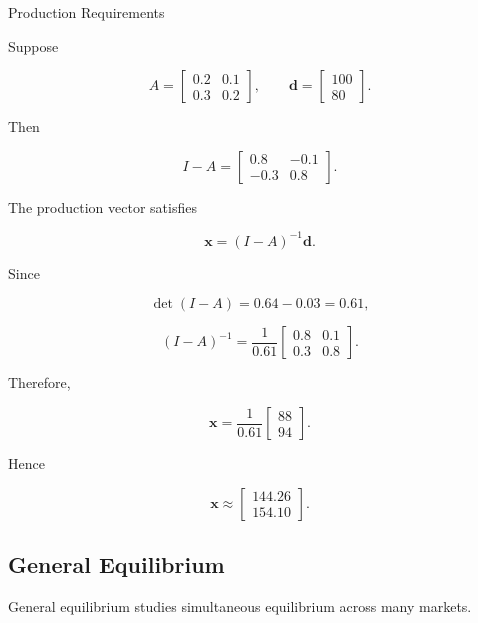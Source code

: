 \begin{workedexamplebox}{Production Requirements}

Suppose

\[
A
=
\begin{bmatrix}
0.2 & 0.1\\
0.3 & 0.2
\end{bmatrix},
\qquad
\mathbf{d}
=
\begin{bmatrix}
100\\
80
\end{bmatrix}.
\]

Then

\[
I-A
=
\begin{bmatrix}
0.8 & -0.1\\
-0.3 & 0.8
\end{bmatrix}.
\]

The production vector satisfies

\[
\mathbf{x}
=
(I-A)^{-1}\mathbf{d}.
\]

Since

\[
\det(I-A)
=
0.64-0.03
=
0.61,
\]

\[
(I-A)^{-1}
=
\frac{1}{0.61}
\begin{bmatrix}
0.8 & 0.1\\
0.3 & 0.8
\end{bmatrix}.
\]

Therefore,

\[
\mathbf{x}
=
\frac{1}{0.61}
\begin{bmatrix}
88\\
94
\end{bmatrix}.
\]

Hence

\begin{answerbox}
\[
\boxed{
\mathbf{x}
\approx
\begin{bmatrix}
144.26\\
154.10
\end{bmatrix}.
}
\]
\end{answerbox}

\end{workedexamplebox}

\subsection{General Equilibrium}
\label{subsec:general-equilibrium}

General equilibrium studies simultaneous equilibrium across many markets.

